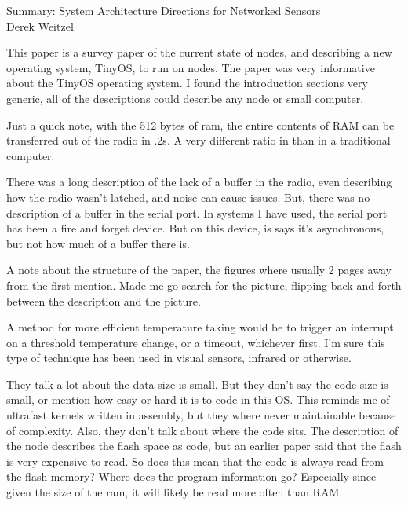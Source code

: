 \documentclass[12pt]{article}
\begin{document}
\begin{center}
{\huge Summary: System Architecture Directions for Networked Sensors } \\
Derek Weitzel
\end{center}

This paper is a survey paper of the current state of nodes, and describing a new operating system, TinyOS, to run on nodes.  The paper was very informative about the TinyOS operating system.  I found the introduction sections very generic, all of the descriptions could describe any node or small computer.

Just a quick note, with the 512 bytes of ram, the entire contents of RAM can be transferred out of the radio in .2s.  A very different ratio in than in a traditional computer.

There was a long description of the lack of a buffer in the radio, even describing how the radio wasn't latched, and noise can cause issues.  But, there was no description of a buffer in the serial port.  In systems I have used, the serial port has been a fire and forget device.  But on this device, is says it's asynchronous, but not how much of a buffer there is.

A note about the structure of the paper, the figures where usually 2 pages away from the first mention.  Made me go search for the picture, flipping back and forth between the description and the picture.

A method for more efficient temperature taking would be to trigger an interrupt on a threshold temperature change, or a timeout, whichever first.  I'm sure this type of technique has been used in visual sensors, infrared or otherwise.

They talk a lot about the data size is small.  But they don't say the code size is small, or mention how easy or hard it is to code in this OS.  This reminds me of ultrafast kernels written in assembly, but they where never maintainable because of complexity.  Also, they don't talk about where the code sits.  The description of the node describes the flash space as code, but an earlier paper said that the flash is very expensive to read.  So does this mean that the code is always read from the flash memory?  Where does the program information go?  Especially since given the size of the ram, it will likely be read more often than RAM.
\end{document}
